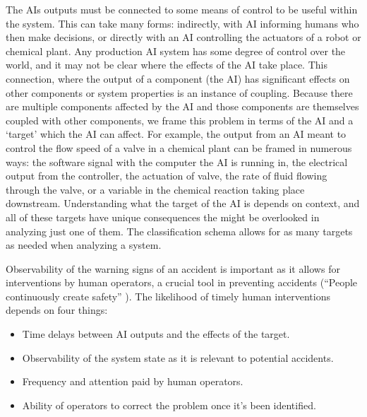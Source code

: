 \documentclass[11pt]{article}
\begin{document}
The AIs outputs must be connected to some means of control to be useful within the system. This can
take many forms: indirectly, with AI informing humans who then make decisions, or directly with an
AI controlling the actuators of a robot or chemical plant. Any production AI system has some degree
of control over the world, and it may not be clear where the effects of the AI take place. This
connection, where the output of a component (the AI) has significant effects on other components or
system properties is an instance of coupling. Because there are multiple components affected by the
AI and those components are themselves coupled with other components, we frame this problem in terms
of the AI and a `target' which the AI can affect.  For example, the output from an AI meant to
control the flow speed of a valve in a chemical plant can be framed in numerous ways: the software
signal with the computer the AI is running in, the electrical output from the controller, the
actuation of valve, the rate of fluid flowing through the valve, or a variable in the chemical
reaction taking place downstream. Understanding what the target of the AI is depends on context, and
all of these targets have unique consequences the might be overlooked in analyzing just one of them.
The classification schema allows for as many targets as needed when analyzing a system.

Observability of the warning signs of an accident is important as it allows for interventions by
human operators, a crucial tool in preventing accidents (``People continuously create safety''
\cite{cook1998complex}). The likelihood of timely human interventions depends on four things:
\begin{itemize}
    \item Time delays between AI outputs and the effects of the target.
    \item Observability of the system state as it is relevant to potential accidents.
    \item Frequency and attention paid by human operators.
    \item Ability of operators to correct the problem once it's been identified.
\end{itemize}
\end{document}
